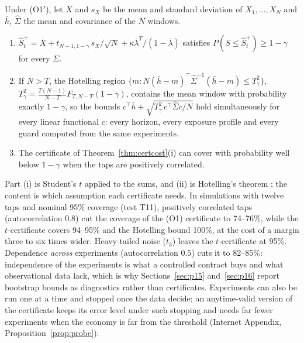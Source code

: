 \begin{proposition}\label{prop:hotelling}
Under (O1$'$), let $\bar X$ and $s_X$ be the mean and standard deviation of $X_1,\ldots,X_N$ and $\bar h$, $\hat\Sigma$ the mean and covariance of the $N$ windows.
\begin{enumerate}[label=(\roman*)]
\item $\hat S^+_t=\bar X+t_{N-1,1-\gamma}\,s_X/\sqrt N+\kappa\bar\lambda^T/(1-\bar\lambda)$ satisfies $P(S\le\hat S^+_t)\ge1-\gamma$ for every $\Sigma$.
\item If $N>T$, the Hotelling region $\{m:N(\bar h-m)^\top\hat\Sigma^{-1}(\bar h-m)\le T^2_\gamma\}$, $T^2_\gamma=\frac{T(N-1)}{N-T}F_{T,N-T}(1-\gamma)$, contains the mean window with probability exactly $1-\gamma$, so the bounds $c^\top\bar h+\sqrt{T^2_\gamma\,c^\top\hat\Sigma c/N}$ hold simultaneously for every linear functional $c$: every horizon, every exposure profile and every guard computed from the same experiments.
\item The certificate of Theorem~\ref{thm:certcost}(i) can cover with probability well below $1-\gamma$ when the taps are positively correlated.
\end{enumerate}
\end{proposition}

Part (i) is Student's $t$ applied to the sums, and (ii) is Hotelling's theorem \citep{hotelling1931}; the content is which assumption each certificate needs. In simulations with twelve taps and nominal 95\% coverage (test T11), positively correlated taps (autocorrelation $0.8$) cut the coverage of the (O1) certificate to 74--76\%, while the $t$-certificate covers 94--95\% and the Hotelling bound 100\%, at the cost of a margin three to six times wider. Heavy-tailed noise ($t_3$) leaves the $t$-certificate at 95\%. Dependence \emph{across} experiments (autocorrelation $0.5$) cuts it to 82--85\%: independence of the experiments is what a controlled contract buys and what observational data lack, which is why Sections~\ref{sec:p15} and~\ref{sec:p16} report bootstrap bounds as diagnostics rather than certificates. Experiments can also be run one at a time and stopped once the data decide; an anytime-valid version of the certificate keeps its error level under such stopping and needs far fewer experiments when the economy is far from the threshold (Internet Appendix, Proposition~\ref{prop:probe}).

